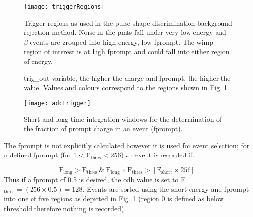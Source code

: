 \begin{description}
\begin{figure}[ht]
\centering
\texttt{[image: triggerRegions]}
\caption{Trigger regions as used in the pulse shape discrimination background rejection method. Noise in the \gls{pmt}s fall under very low energy and $\beta$ events are grouped into high energy, low \gls{fprompt}. The \gls{wimp} region of interest is at high \gls{fprompt} and could fall into either region of energy.}
\label{Fig:triggerRegions}
\end{figure}

\begin{figure}
	\begin{bytefield}[endianness=big, bitheight=3.0\baselineskip]{30}
	\end{bytefield}
	\caption{trig\_out variable, the higher the charge and \gls{fprompt}, the higher the value. Values and colours correspond to the regions shown in Fig. \ref{Fig:triggerRegions}.}
	\label{Fig:bitFieldADCTrig}
\end{figure}

\end{description} 
\begin{figure}[ht]
\centering
\texttt{[image: adcTrigger]}
\caption{Short and long time integration windows for the determination of the fraction of prompt charge in an event (\gls{fprompt}).}
\label{Fig:adcTrigger}
\end{figure}

The \gls{fprompt} is not explicitly calculated however it is used for event selection; for a defined \gls{fprompt} (for 1$<$F$_{\text{thres}}< 256$) an event is recorded if:

\begin{equation}
\text{E}_{\text{long}} > \text{E}_{\text{thres}} \ \& \ \text{E}_{\text{long}} \times \text{F}_{\text{thres}} >\left[ \text{E}_{\text{short}} \times 256\right].
\label{Eq:fpromptDecision} 
\end{equation}
Thus if a \gls{fprompt} of 0.5 is desired, the \gls{odb} value is set to F$_{\text{thres}} = (256 \times 0.5) = 128$. Events are sorted using the short energy and \gls{fprompt} into one of five regions as depicted in Fig. \ref{Fig:triggerRegions} (region 0 is defined as below threshold therefore nothing is recorded).

